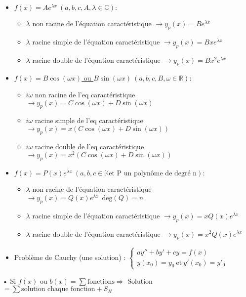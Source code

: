 \documentclass[12 pt]{exampleclass}
\begin{document}
\begin{flushleft}
\begin{doublespace}
\begin{itemize}
		\item \underline{$f(x) = A e^{\lambda x} \ (a,b,c,A,\lambda \in \mathbb{C}):$}
			\begin{itemize}
				\item $\lambda$ non racine de l'équation caractéristique $\rightarrow y_p(x) = B e^{\lambda x}$
				\item $\lambda$ racine simple de l'équation caractéristique $\rightarrow y_p(x) =  Bx e^{\lambda x}$
				\item $\lambda$ racine double de l'équation caractéristique $\rightarrow y_p(x) = Bx^2 e^{\lambda x}$
			\end{itemize}
		
		\item \underline{$f(x) = B\cos(\omega x)$ ou $ B\sin(\omega x) \ (a,b,c,B,\omega \in \mathbb{R}):$}
			\begin{itemize}
				\item $i\omega$ non racine de l'eq caractéristique $\rightarrow y_p(x) = C \cos(\omega x) + D \sin(\omega x)$
				\item $i\omega$ racine simple de l'eq caractéristique $\rightarrow y_p(x) =  x (C \cos(\omega x) + D \sin(\omega x))$
				\item $i\omega$ racine double de l'eq caractéristique $\rightarrow y_p(x) = x^2 (C \cos(\omega x) + D \sin(\omega x))$
			\end{itemize}
		\item \underline{$f(x) = P(x) e^{\lambda x} \ (a,b,c \in \mathbb{K} \text{et P un polynôme de degré n}):$}
			\begin{itemize}
				\item $\lambda$ non racine de l'équation caractéristique $\rightarrow y_p(x) = Q(x) e^{\lambda x} \ \ \text{deg}(Q)=n$
				\item $\lambda$ racine simple de l'équation caractéristique $\rightarrow y_p(x) =  xQ(x) e^{\lambda x}$
				\item $\lambda$ racine double de l'équation caractéristique $\rightarrow y_p(x) = x^2Q(x) e^{\lambda x}$
			\end{itemize}
		\item Problème de Cauchy (une solution) :  $ \left\{\begin{array}{ll} ay''+ by' + cy = f(x) \\  y(x_0) = y_0 \ \text{et}\ y'(x_0)=y'_0 \end{array} \right.$
	\end{itemize}
	• Si $f(x)$ ou $b(x) = \sum \text{fonctions} \Rightarrow$ Solution$ = \sum \text{solution chaque fonction} + S_H$

\end{doublespace}
\end{flushleft}
\end{document}

